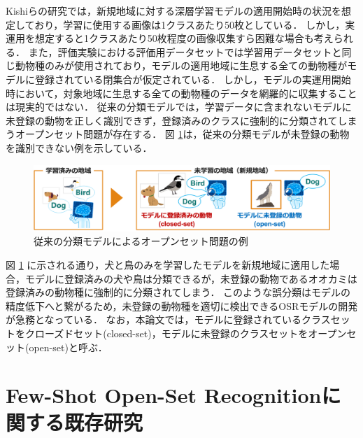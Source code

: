 Kishiらの研究では，新規地域に対する深層学習モデルの適用開始時の状況を想定しており，学習に使用する画像は1クラスあたり50枚としている．
しかし，実運用を想定すると1クラスあたり50枚程度の画像収集すら困難な場合も考えられる．
また，評価実験における評価用データセットでは学習用データセットと同じ動物種のみが使用されており，モデルの適用地域に生息する全ての動物種がモデルに登録されている閉集合が仮定されている．
しかし，モデルの実運用開始時において，対象地域に生息する全ての動物種のデータを網羅的に収集することは現実的ではない．
従来の分類モデルでは，学習データに含まれないモデルに未登録の動物を正しく識別できず，登録済みのクラスに強制的に分類されてしまうオープンセット問題が存在する．
図 \ref{fig:non_osr}は，従来の分類モデルが未登録の動物を識別できない例を示している．
% 
\begin{figure}[tbp]
  \centering
  \includegraphics[width=\linewidth, keepaspectratio]{image/non_osr.png}
  \caption{従来の分類モデルによるオープンセット問題の例}
  \label{fig:non_osr}
\end{figure}
% 
図 \ref{fig:non_osr} に示される通り，犬と鳥のみを学習したモデルを新規地域に適用した場合，モデルに登録済みの犬や鳥は分類できるが，未登録の動物であるオオカミは登録済みの動物種に強制的に分類されてしまう．
このような誤分類はモデルの精度低下へと繋がるため，未登録の動物種を適切に検出できるOSRモデルの開発が急務となっている．
なお，本論文では，モデルに登録されているクラスセットをクローズドセット(closed-set)，モデルに未登録のクラスセットをオープンセット(open-set)と呼ぶ．


\section{Few-Shot Open-Set Recognitionに関する既存研究}

